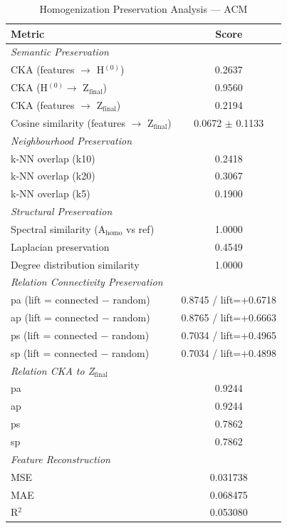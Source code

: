 \begin{table}[h]
\centering
\caption{Homogenization Preservation Analysis — ACM}
\label{tab:preservation_acm}
\begin{tabular}{lc}
\toprule
\textbf{Metric} & \textbf{Score} \\
\midrule
\multicolumn{2}{l}{\textit{Semantic Preservation}} \\
CKA (features $\rightarrow$ H$^{(0)}$) & 0.2637 \\
CKA (H$^{(0)} \rightarrow$ Z$_{\mathrm{final}}$) & 0.9560 \\
CKA (features $\rightarrow$ Z$_{\mathrm{final}}$) & 0.2194 \\
Cosine similarity (features $\rightarrow$ Z$_{\mathrm{final}}$) & 0.0672 $\pm$ 0.1133 \\
\midrule
\multicolumn{2}{l}{\textit{Neighbourhood Preservation}} \\
k-NN overlap (k10) & 0.2418 \\
k-NN overlap (k20) & 0.3067 \\
k-NN overlap (k5) & 0.1900 \\
\midrule
\multicolumn{2}{l}{\textit{Structural Preservation}} \\
Spectral similarity (A$_{\mathrm{homo}}$ vs ref) & 1.0000 \\
Laplacian preservation & 0.4549 \\
Degree distribution similarity & 1.0000 \\
\midrule
\multicolumn{2}{l}{\textit{Relation Connectivity Preservation}} \\
pa (lift = connected $-$ random) & 0.8745 / lift=+0.6718 \\
ap (lift = connected $-$ random) & 0.8765 / lift=+0.6663 \\
ps (lift = connected $-$ random) & 0.7034 / lift=+0.4965 \\
sp (lift = connected $-$ random) & 0.7034 / lift=+0.4898 \\
\midrule
\multicolumn{2}{l}{\textit{Relation CKA to Z$_{\mathrm{final}}$}} \\
pa & 0.9244 \\
ap & 0.9244 \\
ps & 0.7862 \\
sp & 0.7862 \\
\midrule
\multicolumn{2}{l}{\textit{Feature Reconstruction}} \\
MSE & 0.031738 \\
MAE & 0.068475 \\
R$^2$ & 0.053080 \\

\end{tabular}
\end{table}
